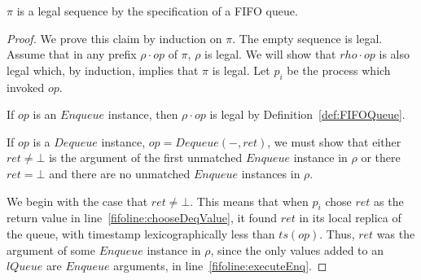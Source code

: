 \documentclass[a4paper,anonymous,USenglish]{lipics-v2021} %
\theoremstyle{definition}
\begin{document}

\begin{lemma}\label{fifolem:legal}
  $\pi$ is a legal sequence by the specification of a FIFO queue.
\end{lemma}

\begin{proof}
  We prove this claim by induction on $\pi$.  The empty sequence is legal.  Assume that in any prefix $\rho \cdot op$ of $\pi$, $\rho$ is legal.  We will show that $rho \cdot op$ is also legal which, by induction, implies that $\pi$ is legal.  Let $p_i$ be the process which invoked $op$.

  If $op$ is an $Enqueue$ instance, then $\rho \cdot op$ is legal by Definition~\ref{def:FIFOQueue}.

  If $op$ is a $Dequeue$ instance, $op = Dequeue(-,ret)$, we must show that either $ret \neq \bot$ is the argument of the first unmatched $Enqueue$ instance in $\rho$ or there $ret = \bot$ and there are no unmatched $Enqueue$ instances in $\rho$.

  We begin with the case that $ret \neq \bot$.  This means that when $p_i$ chose $ret$ as the return value in line~\ref{fifoline:chooseDeqValue}, it found $ret$ in its local replica of the queue, with timestamp lexicographically less than $ts(op)$.  Thus, $ret$ was the argument of some $Enqueue$ instance in $\rho$, since the only values added to an $lQueue$ are $Enqueue$ arguments, in line~\ref{fifoline:executeEnq}.

  


\end{proof}
\end{document}
